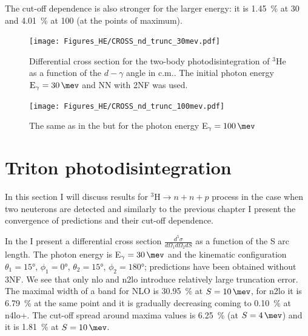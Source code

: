     The cut-off dependence is also stronger for the larger energy:
    it is  \SI{1.45}{\percent} at \SI{30}{\mev} and \SI{4.01}{\percent} at \SI{100}{\mev}
    (at the points of maximum). 

\begin{figure}[h]
    \begin{center}
        \texttt{[image: Figures\_HE/CROSS\_nd\_trunc\_30mev.pdf]}
        \end{center}
        \caption{Differential cross section for the
        two-body photodisintegration of $^3$He as a function of the $d-\gamma$ angle in c.m..
        The initial photon energy $\text{E}_\gamma=\SI{30}{\mev}$ and NN with 2NF was used.}
        \label{CROSS_nd_30}
    \end{figure}


    \begin{figure}[h]
        \begin{center}
        \texttt{[image: Figures\_HE/CROSS\_nd\_trunc\_100mev.pdf]}
        \end{center}
        \caption{The same as in the  but 
        for the photon energy E$_\gamma=\SI{100}{\mev}$}
        \label{CROSS_nd_100}
    \end{figure}

    \clearpage
\section{Triton photodisintegration}
    \label{sec:triton_results}
    
    
    In this section I will discuss results
    for $^3\text{H} \rightarrow n + n + p$ process in the case when two neuterons are detected 
    and similarly to the previous chapter I present the convergence of predictions 
    and their cut-off dependence. 

    In the  I present a differential cross section 
    $\frac{d^5\sigma}{d\Omega_1d\Omega_2dS}$ as a function of the S arc length.
    The photon energy is  E$_\gamma=\SI{30}{\mev}$ and the kinematic configuration
    $\theta_1 = \ang{15}$, $\phi_1 = \ang{0}$,
    $\theta_2 = \ang{15}$, $\phi_2 = \ang{180}$; predictions have been obtained without 3NF.
    We see that only \gls{nlo} and \gls{n2lo} introduce relatively large truncation error.
    The maximal width of a band for NLO is \SI{30.95}{\percent} at $S=\SI{10}{\mev}$,
    for \gls{n2lo} it is \SI{6.79}{\percent} at the same point and it is gradually decreasing
    coming to \SI{0.10}{\percent} at \gls{n4lo+}.
    The cut-off spread around maxima values is \SI{6.25}{\percent} (at $S=\SI{4}{\mev}$) and it is
    \SI{1.81}{\percent} at $S=\SI{10}{\mev}$.

